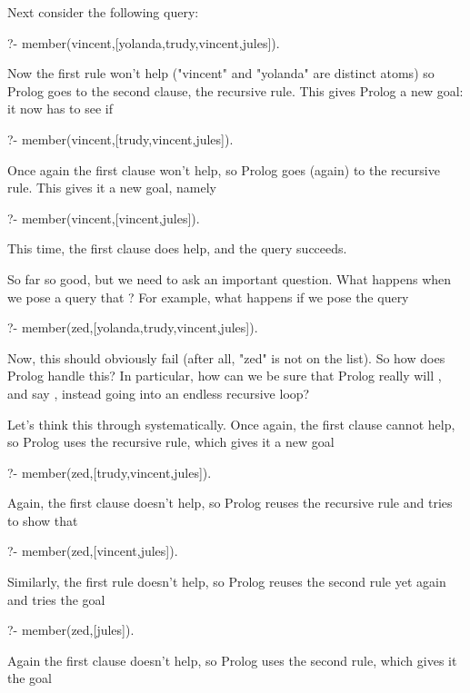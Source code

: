Next consider the following query:

\begin{LPNcodedisplay}
?- member(vincent,[yolanda,trudy,vincent,jules]).
\end{LPNcodedisplay}
Now the first rule won't help ("vincent" and "yolanda" are
distinct atoms) so Prolog goes to the second clause, the recursive
rule. This gives Prolog a new goal: it now has to see if

\begin{LPNcodedisplay}
?- member(vincent,[trudy,vincent,jules]).
\end{LPNcodedisplay}
Once again the first clause won't help, so Prolog goes (again) to
the recursive rule. This gives it a new goal, namely

\begin{LPNcodedisplay}
?- member(vincent,[vincent,jules]).
\end{LPNcodedisplay}
This time, the first clause does help, and the query succeeds.

So far so good, but we need to ask an important question.  What
happens when we pose a query that ?  For example, what
happens if we pose the query

\begin{LPNcodedisplay}
?- member(zed,[yolanda,trudy,vincent,jules]).
\end{LPNcodedisplay}


Now, this should obviously fail (after all, "zed" is not on the
list).  So how does Prolog handle this?  In particular, how can we be
sure that Prolog really will , and say , instead
going into an endless recursive loop?

Let's think this through systematically.  Once again, the first clause
cannot help, so Prolog uses the recursive rule, which gives it a new
goal

\begin{LPNcodedisplay}
?- member(zed,[trudy,vincent,jules]).
\end{LPNcodedisplay}
Again, the first clause doesn't help, so Prolog reuses the recursive
rule and tries to show that

\begin{LPNcodedisplay}
?- member(zed,[vincent,jules]).
\end{LPNcodedisplay}
Similarly, the first rule doesn't help, so Prolog reuses the second
rule yet again and tries the goal
\begin{LPNcodedisplay}
?- member(zed,[jules]).
\end{LPNcodedisplay}
Again the first clause doesn't help, so Prolog uses the second rule,
which gives it the goal

